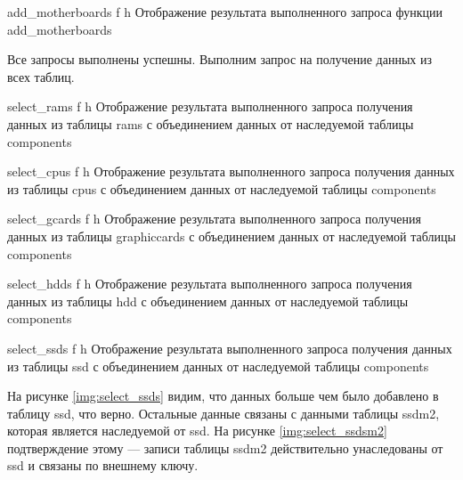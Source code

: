 {add_motherboards} %
{f} %
{h} %
{\textwidth} %
{Отображение результата выполненного запроса функции add\_motherboards} %

Все запросы выполнены успешны. Выполним запрос на получение данных из всех таблиц.

{select_rams} %
{f} %
{h} %
{\textwidth} %
{Отображение результата выполненного запроса получения данных из таблицы rams с объединением данных от наследуемой таблицы components} %

{select_cpus} %
{f} %
{h} %
{\textwidth} %
{Отображение результата выполненного запроса получения данных из таблицы cpus с объединением данных от наследуемой таблицы components} %

{select_gcards} %
{f} %
{h} %
{\textwidth} %
{Отображение результата выполненного запроса получения данных из таблицы graphiccards с объединением данных от наследуемой таблицы components} %

{select_hdds} %
{f} %
{h} %
{\textwidth} %
{Отображение результата выполненного запроса получения данных из таблицы hdd с объединением данных от наследуемой таблицы components} %

{select_ssds} %
{f} %
{h} %
{\textwidth} %
{Отображение результата выполненного запроса получения данных из таблицы ssd с объединением данных от наследуемой таблицы components} %

На рисунке \ref{img:select_ssds} видим, что данных больше чем было добавлено в таблицу ssd, что верно. Остальные данные связаны с данными таблицы ssdm2, которая является наследуемой от ssd. На рисунке \ref{img:select_ssdsm2} подтверждение этому --- записи таблицы ssdm2 действительно унаследованы от ssd и связаны по внешнему ключу. 

